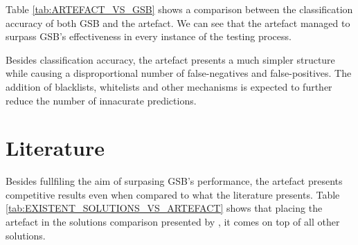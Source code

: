 Table \ref{tab:ARTEFACT_VS_GSB} shows a comparison between the classification accuracy of both GSB and the artefact. We can see that the artefact managed to surpass GSB's effectiveness in every instance of the testing process.

Besides classification accuracy, the artefact presents a much simpler structure while causing a disproportional number of false-negatives and false-positives. The addition of blacklists, whitelists and other mechanisms is expected to further reduce the number of innacurate predictions.

\section{Literature}
Besides fullfiling the aim of surpasing GSB's performance, the artefact presents competitive results even when compared to what the literature presents. Table \ref{tab:EXISTENT_SOLUTIONS_VS_ARTEFACT} shows that placing the artefact in the solutions comparison presented by \cite{INTELLIGENT_PHISHING_ANFIS}, it comes on top of all other solutions.


